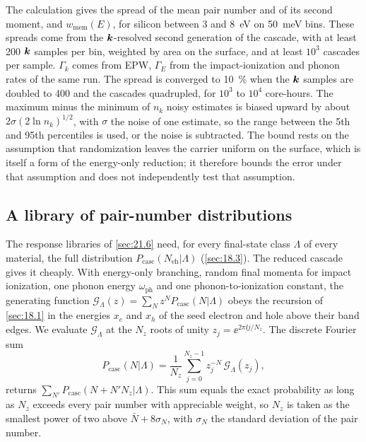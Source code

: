 The calculation gives the spread of the mean pair number and of its second moment, and $w_{\mathrm{mem}}(E)$, for silicon between 3 and \SI{8}{eV} on \SI{50}{meV} bins. These spreads come from the $\bm{k}$-resolved second generation of the cascade, with at least 200 $\bm{k}$ samples per bin, weighted by area on the surface, and at least $10^3$ cascades per sample. $\varGamma_k$ comes from EPW, $\varGamma_E$ from the impact-ionization and phonon rates of the same run. The spread is converged to \SI{10}{\percent} when the $\bm{k}$ samples are doubled to 400 and the cascades quadrupled, for $10^3$ to $10^4$ core-hours. The maximum minus the minimum of $n_k$ noisy estimates is biased upward by about $2\sigma(2\ln n_k)^{1/2}$, with $\sigma$ the noise of one estimate, so the range between the 5th and 95th percentiles is used, or the noise is subtracted. The bound rests on the assumption that randomization leaves the carrier uniform on the surface, which is itself a form of the energy-only reduction; it therefore bounds the error under that assumption and does not independently test that assumption.

\subsection{A library of pair-number distributions}

The response libraries of \cref{sec:21.6} need, for every final-state class $\Lambda$ of every material, the full distribution $P_{\mathrm{casc}}(N_{\mathrm{eh}}|\Lambda)$ (\cref{sec:18.3}). The reduced cascade gives it cheaply. With energy-only branching, random final momenta for impact ionization, one phonon energy $\omega_{\mathrm{ph}}$ and one phonon-to-ionization constant, the generating function $\mathcal{G}_\Lambda(z) = \sum_Nz^NP_{\mathrm{casc}}(N|\Lambda)$ obeys the recursion of \cref{sec:18.1} in the energies $x_e$ and $x_h$ of the seed electron and hole above their band edges. We evaluate $\mathcal{G}_\Lambda$ at the $N_z$ roots of unity $z_j = \ee^{2\pi\ii j/N_z}$. The discrete Fourier sum
\begin{equation}
  P_{\mathrm{casc}}(N|\Lambda) = \frac{1}{N_z}\sum_{j=0}^{N_z-1}z_j^{-N}\,\mathcal{G}_\Lambda(z_j) ,
  \label{eq:E.24-dft}
\end{equation}
returns $\sum_{N'}P_{\mathrm{casc}}(N + N'N_z|\Lambda)$. This sum equals the exact probability as long as $N_z$ exceeds every pair number with appreciable weight, so $N_z$ is taken as the smallest power of two above $\bar N + 8\sigma_N$, with $\sigma_N$ the standard deviation of the pair number.

